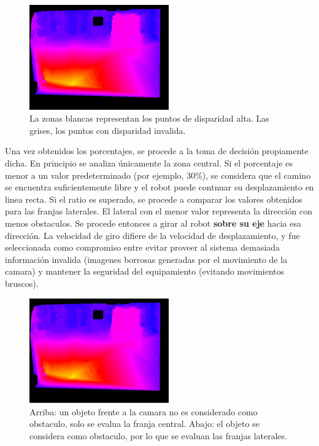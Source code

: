 \documentclass[journal]{IEEEtran}
\begin{document}
\begin{figure}[ht]
	\begin{center}
		\includegraphics[width=6cm]{./images/disparidad.jpg}
		\caption{La zonas blancas representan los puntos de disparidad alta. Las grises, los puntos con disparidad invalida.}
	\end{center}
\end{figure}

Una vez obtenidos los porcentajes, se procede a la toma de decisi\'on propiamente dicha. En principio se analiza \'unicamente la zona central. Si el porcentaje es menor a un valor predeterminado (por ejemplo, 30\%), se considera que el camino se encuentra suficientemente libre y el robot puede contnuar su desplazamiento en linea recta. Si el ratio es superado, se procede a comparar los valores obtenidos para las franjas laterales. El lateral con el menor valor representa la direcci\'on con menos obstaculos. Se procede entonces a girar al robot {\bf sobre su eje} hacia esa direcci\'on. La velocidad de giro difiere de la velocidad de desplazamiento, y fue seleccionada como compromiso entre evitar proveer al sistema demasiada informaci\'on invalida (imagenes borrosas generadas por el movimiento de la camara) y  mantener la seguridad del equipamiento (evitando movimientos bruscos).

\begin{figure}[ht]
	\begin{center}
		\includegraphics[width=6cm]{./images/disparidad.jpg}
		\caption{Arriba: un objeto frente a la camara no es considerado como obstaculo, solo se evalua la franja central. Abajo: el objeto se considera como obstaculo, por lo que se evaluan las franjas laterales.}
	\end{center}
\end{figure}
\end{document}
